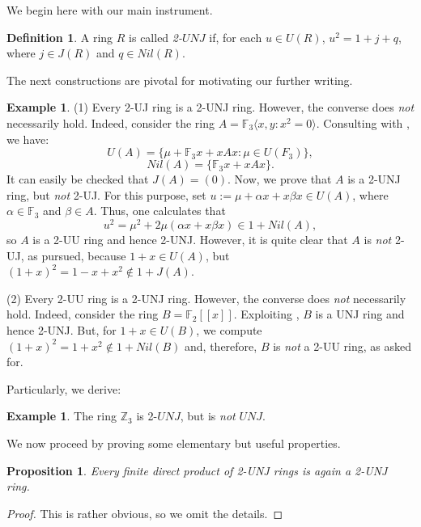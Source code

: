 \documentclass[12pt]{amsart}
\newtheorem{proposition}[theorem]{Proposition}
\theoremstyle{definition}
\newtheorem{example}[theorem]{Example}
\newtheorem{definition}[theorem]{Definition}
\begin{document}
\medskip

We begin here with our main instrument.

\begin{definition}
A ring $R$ is called {\it 2-$UNJ$} if, for each $u\in U(R)$, $u^2=1+j+q$, where $j\in J(R)$ and $q\in Nil(R)$.	
\end{definition}

The next constructions are pivotal for motivating our further writing.

\begin{example}\label{con xemple}
(1) Every 2-UJ ring is a 2-UNJ ring. However, the converse does {\it not} necessarily hold. Indeed, consider the ring $A = \mathbb{F}_3\langle x,y : x^2=0 \rangle$. Consulting with \cite[Lemma 3.18]{ns}, we have:
\[ U(A) = \{\mu + \mathbb{F}_3x + xAx : \mu \in U(F_3)\}, \]
\[ Nil(A) = \{\mathbb{F}_3x + xAx\}. \]
It can easily be checked that $J(A) = (0)$. Now, we prove that $A$ is a 2-UNJ ring, but {\it not} 2-UJ. For this purpose, set $u := \mu + \alpha x + x\beta x \in U(A)$, where $\alpha \in \mathbb{F}_3$ and $\beta \in A$. Thus, one calculates that
\[ u^2 = \mu^2 + 2\mu(\alpha x + x\beta x) \in 1 + Nil(A), \]
so $A$ is a 2-UU ring and hence 2-UNJ. However, it is quite clear that $A$ is {\it not} 2-UJ, as pursued, because $1 + x \in U(A)$, but $(1 + x)^2 = 1 - x + x^2 \notin 1 + J(A)$.

\medskip
	
(2) Every 2-UU ring is a 2-UNJ ring. However, the converse does {\it not} necessarily hold. Indeed, consider the ring $B = \mathbb{F}_2[[x]]$. Exploiting \cite[Example 2.1]{22}, $B$ is a UNJ ring and hence 2-UNJ. But, for $1 + x \in U(B)$, we compute $(1 + x)^2 = 1 + x^2 \notin 1 + Nil(B)$ and, therefore, $B$ is {\it not} a 2-UU ring, as asked for.
\end{example}

Particularly, we derive:

\begin{example}\label{3.32}
The ring $\mathbb{Z}_3$ is 2-$UNJ$, but is {\it not} $UNJ$.	
\end{example}

We now proceed by proving some elementary but useful properties.

\begin{proposition}\label{3.1}
Every finite direct product of 2-UNJ rings is again a 2-UNJ ring.
\end{proposition}

\begin{proof}
This is rather obvious, so we omit the details.
\end{proof}
\end{document}
